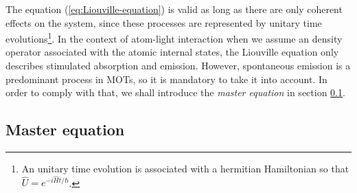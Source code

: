 The equation (\ref{eq:Liouville-equation}) is valid as long as there are only coherent effects on the system,  since these processes are represented by unitary time evolutions\footnote{An unitary time evolution is associated with a hermitian Hamiltonian so that $ \hat{U} = e^{-i \hat{H}t / \hbar} $.}. In the context of atom-light interaction when we assume an density operator associated with the atomic internal states, the Liouville equation only describes stimulated absorption and emission. However, spontaneous emission is a predominant process in MOTs, so it is mandatory to take it into account. In order to comply with that, we shall introduce the \textit{master equation} in section \ref{sec:master-equation}.

%
\subsection{Master equation}
\label{sec:master-equation}
%

